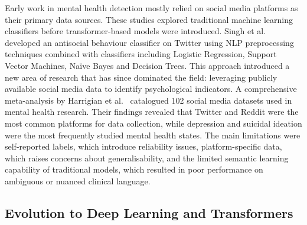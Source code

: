 \documentclass[11pt]{article}
\begin{document}
Early work in mental health detection mostly relied on social media platforms as their primary
data sources. These studies explored traditional machine learning classifiers before
transformer-based models were introduced. Singh et al.~\cite{singh2020framework} developed an
antisocial behaviour classifier on Twitter using NLP preprocessing techniques combined with
classifiers including Logistic Regression, Support Vector Machines, Na\"{i}ve Bayes and Decision
Trees. This approach introduced a new area of research that has since dominated the field:
leveraging publicly available social media data to identify psychological indicators. A
comprehensive meta-analysis by Harrigian et al.~\cite{harrigian2021state} catalogued 102 social
media datasets used in mental health research. Their findings revealed that Twitter and Reddit
were the most common platforms for data collection, while depression and suicidal ideation were
the most frequently studied mental health states. The main limitations were self-reported labels,
which introduce reliability issues, platform-specific data, which raises concerns about
generalisability, and the limited semantic learning capability of traditional models, which
resulted in poor performance on ambiguous or nuanced clinical language.

\subsection{Evolution to Deep Learning and Transformers}
\end{document}

